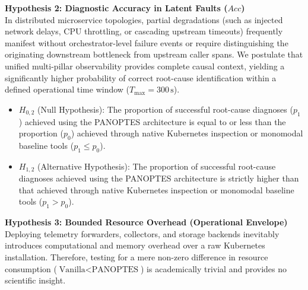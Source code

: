 \textbf{Hypothesis 2: Diagnostic Accuracy in Latent Faults ($Acc$)}\\
In distributed microservice topologies, partial degradations (such as injected network delays, CPU throttling, or cascading upstream timeouts) frequently manifest without orchestrator-level failure events or require distinguishing the originating downstream bottleneck from upstream caller spans. We postulate that unified multi-pillar observability provides complete causal context, yielding a significantly higher probability of correct root-cause identification within a defined operational time window ($T_{\text{max}} = 300\,\text{s}$).
\begin{itemize}
    \item $H_{0,2}$ (Null Hypothesis): The proportion of successful root-cause diagnoses ($p_1$) achieved using the PANOPTES architecture is equal to or less than the proportion ($p_0$) achieved through native Kubernetes inspection or monomodal baseline tools ($p_1 \le p_0$).
    \item $H_{1,2}$ (Alternative Hypothesis): The proportion of successful root-cause diagnoses achieved using the PANOPTES architecture is strictly higher than that achieved through native Kubernetes inspection or monomodal baseline tools ($p_1 > p_0$).
\end{itemize}

\textbf{Hypothesis 3: Bounded Resource Overhead (Operational Envelope)}\\
Deploying telemetry forwarders, collectors, and storage backends inevitably introduces computational and memory overhead over a raw Kubernetes installation. Therefore, testing for a mere non-zero difference in resource consumption ($\text{Vanilla} < \text{PANOPTES}$) is academically trivial and provides no scientific insight.

